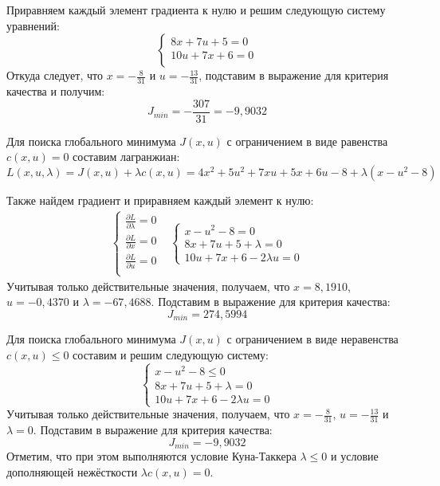 \documentclass[14pt, a4paper]{extarticle}
\begin{document}
	Приравняем каждый элемент градиента к нулю и решим следующую систему уравнений:
	$$\begin{cases}
		8x+7u+5=0 \\
		10u+7x+6=0 \\
	\end{cases}$$
	Откуда следует, что $x=-\frac{8}{31}$ и $u=-\frac{13}{31}$, подставим в выражение для критерия качества и получим:
	$$J_{min}=-\frac{307}{31}=-9,9032$$
	
	Для поиска глобального минимума $J(x,u)$ с ограничением в виде равенства $c(x,u)=0$ составим лагранжиан:
	$$L(x,u,\lambda)=J(x,u) + \lambda c(x,u) = 4x^2+5u^2+7xu+5x+6u-8 + \lambda (x-u^2-8)$$
	
	Также найдем градиент и приравняем каждый элемент к нулю:
	$$\begin{matrix}
		\begin{cases}
			\frac{\partial L}{\partial \lambda}=0 \\
			\frac{\partial L}{\partial x}=0 \\
			\frac{\partial L}{\partial u}=0 \\
		\end{cases} &
		\begin{cases}
			x-u^2-8 = 0 \\
			8x+7u+5+\lambda = 0 \\
			10u+7x+6-2\lambda u = 0
		\end{cases}
	\end{matrix}$$
	Учитывая только действительные значения, получаем, что $x=8,1910$, $u=-0,4370$ и $\lambda=-67,4688$. Подставим в выражение для критерия качества:
	$$J_{min} = 274,5994$$
	
	Для поиска глобального минимума $J(x,u)$ с ограничением в виде неравенства $c(x,u)\le0$ составим и решим следующую систему:
	$$\begin{cases}
		x-u^2-8 \le 0 \\
		8x+7u+5+\lambda = 0 \\
		10u+7x+6-2\lambda u = 0
	\end{cases}$$
	Учитывая только действительные значения, получаем, что $x=-\frac{8}{31}$, $u=-\frac{13}{31}$ и $\lambda=0$. Подставим в выражение для критерия качества:
	$$J_{min}=-9,9032$$
	Отметим, что при этом выполняются условие Куна-Таккера $\lambda\le0$ и условие дополняющей нежёсткости $\lambda c(x,u)=0$.
	
\end{document}
